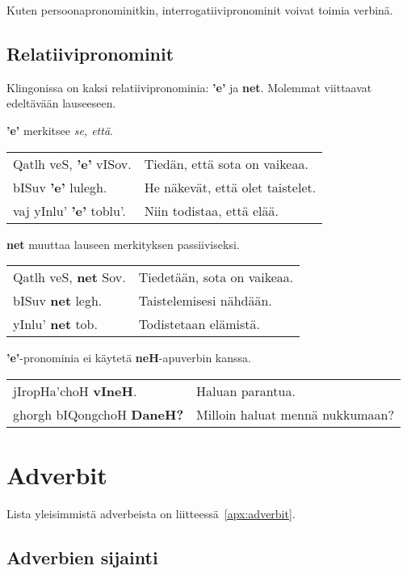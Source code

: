 \documentclass{book}
\begin{document}
Kuten persoonapronominitkin, interrogatiivipronominit voivat toimia verbinä.

\section{Relatiivipronominit}

Klingonissa on kaksi relatiivipronominia: \textbf{'e'} ja \textbf{net}.
Molemmat viittaavat edeltävään lauseeseen.

\textbf{'e'} merkitsee \textit{se, että}.

\begin{tabular}{l l}
    Qatlh veS, \textbf{'e'} vISov. & Tiedän, että sota on vaikeaa. \\
    bISuv \textbf{'e'} lulegh. & He näkevät, että olet taistelet. \\
    vaj yInlu' \textbf{'e'} toblu'. & Niin todistaa, että elää. \\
\end{tabular}

\textbf{net} muuttaa lauseen merkityksen passiiviseksi.

\begin{tabular}{l l}
    Qatlh veS, \textbf{net} Sov. & Tiedetään, sota on vaikeaa. \\
    bISuv \textbf{net} legh. & Taistelemisesi nähdään. \\
    yInlu' \textbf{net} tob. & Todistetaan elämistä. \\
\end{tabular}

\textbf{'e'}-pronominia ei käytetä \textbf{neH}-apuverbin kanssa.

\begin{tabular}{l l}
    jIropHa'choH \textbf{vIneH}. & Haluan parantua. \\
    ghorgh bIQongchoH \textbf{DaneH?} & Milloin haluat mennä nukkumaan? \\
\end{tabular}

\chapter{Adverbit}

Lista yleisimmistä adverbeista on liitteessä~\ref{apx:adverbit}.

\section{Adverbien sijainti}
\end{document}

